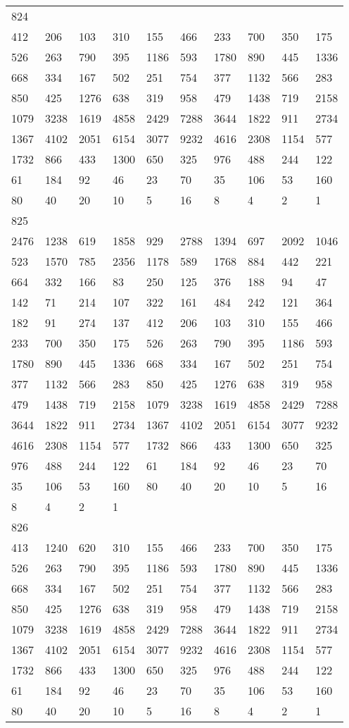 \begin{longtable}{*{10}{l}}
824&&&&&&&&&\\
412& 206& 103& 310& 155& 466& 233& 700& 350& 175\\
526& 263& 790& 395& 1186& 593& 1780& 890& 445& 1336\\
668& 334& 167& 502& 251& 754& 377& 1132& 566& 283\\
850& 425& 1276& 638& 319& 958& 479& 1438& 719& 2158\\
1079& 3238& 1619& 4858& 2429& 7288& 3644& 1822& 911& 2734\\
1367& 4102& 2051& 6154& 3077& 9232& 4616& 2308& 1154& 577\\
1732& 866& 433& 1300& 650& 325& 976& 488& 244& 122\\
61& 184& 92& 46& 23& 70& 35& 106& 53& 160\\
80& 40& 20& 10& 5& 16& 8& 4& 2& 1\\

825&&&&&&&&&\\
2476& 1238& 619& 1858& 929& 2788& 1394& 697& 2092& 1046\\
523& 1570& 785& 2356& 1178& 589& 1768& 884& 442& 221\\
664& 332& 166& 83& 250& 125& 376& 188& 94& 47\\
142& 71& 214& 107& 322& 161& 484& 242& 121& 364\\
182& 91& 274& 137& 412& 206& 103& 310& 155& 466\\
233& 700& 350& 175& 526& 263& 790& 395& 1186& 593\\
1780& 890& 445& 1336& 668& 334& 167& 502& 251& 754\\
377& 1132& 566& 283& 850& 425& 1276& 638& 319& 958\\
479& 1438& 719& 2158& 1079& 3238& 1619& 4858& 2429& 7288\\
3644& 1822& 911& 2734& 1367& 4102& 2051& 6154& 3077& 9232\\
4616& 2308& 1154& 577& 1732& 866& 433& 1300& 650& 325\\
976& 488& 244& 122& 61& 184& 92& 46& 23& 70\\
35& 106& 53& 160& 80& 40& 20& 10& 5& 16\\
8& 4& 2& 1& \\

826&&&&&&&&&\\
413& 1240& 620& 310& 155& 466& 233& 700& 350& 175\\
526& 263& 790& 395& 1186& 593& 1780& 890& 445& 1336\\
668& 334& 167& 502& 251& 754& 377& 1132& 566& 283\\
850& 425& 1276& 638& 319& 958& 479& 1438& 719& 2158\\
1079& 3238& 1619& 4858& 2429& 7288& 3644& 1822& 911& 2734\\
1367& 4102& 2051& 6154& 3077& 9232& 4616& 2308& 1154& 577\\
1732& 866& 433& 1300& 650& 325& 976& 488& 244& 122\\
61& 184& 92& 46& 23& 70& 35& 106& 53& 160\\
80& 40& 20& 10& 5& 16& 8& 4& 2& 1\\


\end{longtable}
